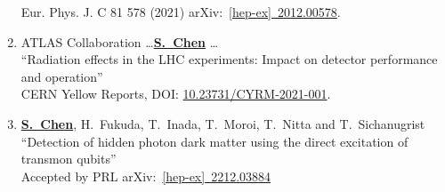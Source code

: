 \documentclass[12pt]{article}
\begin{document}
\begin{enumerate}
          Eur. Phys. J. C 81 578 (2021) arXiv:~\href{https://arxiv.org/abs/2012.00578}{[hep-ex]~2012.00578}. \label{Pub::ATLPaper_muon_Run2}
%
	\item ATLAS Collaboration \dots \underline{\textbf{S.~Chen}} \dots \\
              ``Radiation effects in the LHC experiments: Impact on detector performance and operation'' \\ 
          CERN Yellow Reports, DOI: \href{https://e-publishing.cern.ch/index.php/CYRM/issue/view/129}{10.23731/CYRM-2021-001}. \label{Pub::CERN_YR_radiation}
%
	\item \underline{\textbf{S.~Chen}}, H.~Fukuda, T.~Inada, T.~Moroi, T.~Nitta and T.~Sichanugrist \\
          ``Detection of hidden photon dark matter using the direct excitation of transmon qubits'' \\
	    Accepted by PRL  arXiv:~\href{https://arxiv.org/abs/2212.03884}{[hep-ex]~2212.03884}   \label{Pub::DMQubits1}

\end{enumerate}
\end{document}
